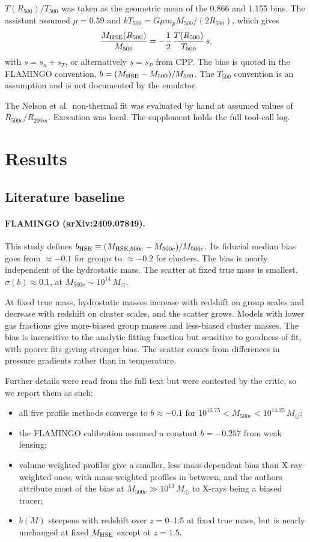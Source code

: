 \documentclass[11pt,a4paper]{article}
\begin{document}
$T(R_{500})/T_{500}$ was taken as the geometric mean of the 0.866 and 1.155 bins. The assistant assumed $\mu=0.59$ and $kT_{500}=G\mu m_p M_{500}/(2R_{500})$, which gives
\begin{equation}
\frac{M_{\rm HSE}(R_{500})}{M_{500}} = -\frac{1}{2}\,\frac{T(R_{500})}{T_{500}}\,s,
\end{equation}
with $s=s_n+s_T$, or alternatively $s=s_P$ from CPP. The bias is quoted in the FLAMINGO convention, $b=(M_{\rm HSE}-M_{500})/M_{500}$. The $T_{500}$ convention is an assumption and is not documented by the emulator.

The Nelson et al.\ non-thermal fit was evaluated by hand at assumed values of $R_{500c}/R_{200m}$. Execution was local. The supplement holds the full tool-call log.

\section{Results}

\subsection{Literature baseline}

\paragraph{FLAMINGO (arXiv:2409.07849).}
This study defines $b_{\rm HSE}\equiv(M_{\rm HSE,500c}-M_{500c})/M_{500c}$. Its fiducial median bias goes from $\approx-0.1$ for groups to $\approx-0.2$ for clusters. The bias is nearly independent of the hydrostatic mass. The scatter at fixed true mass is smallest, $\sigma(b)\approx0.1$, at $M_{500c}\sim10^{14}\,M_\odot$.

At fixed true mass, hydrostatic masses increase with redshift on group scales and decrease with redshift on cluster scales, and the scatter grows. Models with lower gas fractions give more-biased group masses and less-biased cluster masses. The bias is insensitive to the analytic fitting function but sensitive to goodness of fit, with poorer fits giving stronger bias. The scatter comes from differences in pressure gradients rather than in temperature.

Further details were read from the full text but were contested by the critic, so we report them as such:
\begin{itemize}
\item all five profile methods converge to $b\approx-0.1$ for $10^{13.75}<M_{500c}<10^{14.25}\,M_\odot$;
\item the FLAMINGO calibration assumed a constant $b=-0.257$ from weak lensing;
\item volume-weighted profiles give a smaller, less mass-dependent bias than X-ray-weighted ones, with mass-weighted profiles in between, and the authors attribute most of the bias at $M_{500c}\gg10^{13}\,M_\odot$ to X-rays being a biased tracer;
\item $b(M)$ steepens with redshift over $z=0$--1.5 at fixed true mass, but is nearly unchanged at fixed $M_{\rm HSE}$ except at $z=1.5$.
\end{itemize}
\end{document}
